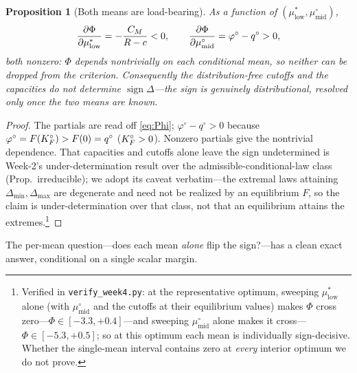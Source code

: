 \documentclass[11pt,reqno]{amsart}
\theoremstyle{plain}
\newtheorem{proposition}{Proposition}
\theoremstyle{definition}
\theoremstyle{remark}
\theoremstyle{remark}\newtheorem{observation}{Observation}
\newcommand{\mustar}{\mu^{*}_{\mathrm{low}}}\newcommand{\mumid}{\mu^{\circ}_{\mathrm{mid}}}
\newcommand{\phio}{\varphi^{\circ}}\newcommand{\qo}{q^{\circ}}
\begin{document}
\begin{proposition}[Both means are load-bearing]\label{thm:minimal}
As a function of $(\mustar,\mumid)$,
\[
  \frac{\partial\Phi}{\partial\mustar}=-\frac{\CM}{R-c}<0,\qquad
  \frac{\partial\Phi}{\partial\mumid}=\phio-\qo>0 ,
\]
both nonzero: $\Phi$ depends nontrivially on each conditional mean, so neither can be
dropped from the criterion. Consequently the distribution-free cutoffs and the capacities
do \emph{not} determine $\operatorname{sign}\Delta$---the sign is genuinely
distributional, resolved only once the two means are known.
\end{proposition}

\begin{proof}
The partials are read off \eqref{eq:Phi}; $\phio-\qo>0$ because $\phio=F(\KFo)>F(0)=\qo$
($K_F^{\circ}>0$). Nonzero partials give the nontrivial dependence. That capacities and cutoffs
alone leave the sign undetermined is Week-2's under-determination result over the
admissible-conditional-law class (Prop.~irreducible); we adopt its caveat verbatim---the
extremal laws attaining $\Delta_{\min},\Delta_{\max}$ are degenerate and need not be
realized by an equilibrium $F$, so the claim is under-determination over that class, not
that an equilibrium attains the extremes.\footnote{Verified in \texttt{verify\_week4.py}:
at the representative optimum, sweeping $\mustar$ alone (with $\mumid$ and the cutoffs at
their equilibrium values) makes $\Phi$ cross zero---$\Phi\in[-3.3,+0.4]$---and sweeping
$\mumid$ alone makes it cross---$\Phi\in[-5.3,+0.5]$; so at this optimum each mean is
individually sign-decisive. Whether the single-mean interval contains zero at
\emph{every} interior optimum we do not prove.}
\end{proof}

The per-mean question---does each mean \emph{alone} flip the sign?---has a clean exact
answer, conditional on a single scalar margin.
\end{document}
